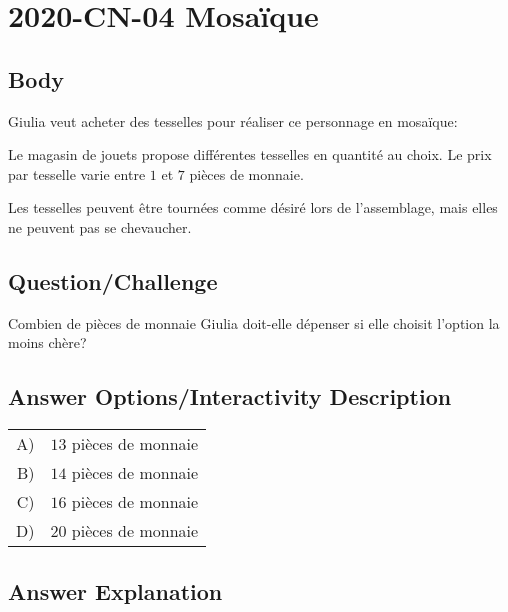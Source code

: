 \documentclass[a4paper,11pt]{report}
\newcommand{\taskGraphicsFolder}{..}
\begin{document}
\section*{\centering{} 2020-CN-04 Mosaïque}


\subsection*{Body}

Giulia veut acheter des tesselles pour réaliser ce personnage en mosaïque:

{\centering%
\par}

Le magasin de jouets propose différentes tesselles en quantité au choix. Le prix par tesselle varie entre $1$ et $7$ pièces de monnaie.

{\centering%
\par}

Les tesselles peuvent être tournées comme désiré lors de l’assemblage, mais elles ne peuvent pas se chevaucher.

{\em

\subsection*{Question/Challenge}

Combien de pièces de monnaie Giulia doit-elle dépenser si elle choisit l’option la moins chère?

}\begingroup
\renewcommand{\arraystretch}{1.5}
\subsection*{Answer Options/Interactivity Description}

\begin{tabular}{ @{} r l @{} }
  A) & $13$ pièces de monnaie \\ 
  B) & $14$ pièces de monnaie \\ 
  C) & $16$ pièces de monnaie \\ 
  D) & $20$ pièces de monnaie
\end{tabular}

\endgroup

\subsection*{Answer Explanation}
\end{document}
